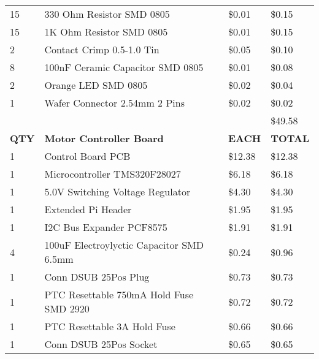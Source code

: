 \begin{table}[H]
{\begin{tabular}{llll}
15           & 330 Ohm Resistor SMD 0805                            & \$0.01        & \$0.15         \\
15           & 1K Ohm Resistor SMD 0805                             & \$0.01        & \$0.15         \\
2            & Contact Crimp 0.5-1.0 Tin                            & \$0.05        & \$0.10         \\
8            & 100nF Ceramic Capacitor SMD 0805                     & \$0.01        & \$0.08         \\
2            & Orange LED SMD 0805                                  & \$0.02        & \$0.04         \\
1            & Wafer Connector 2.54mm 2 Pins                        & \$0.02        & \$0.02         \\
             &                                                      &               & \$49.58        \\  \hline \hline
\textbf{QTY} & \textbf{Motor Controller Board}                      & \textbf{EACH} & \textbf{TOTAL} \\
1            & Control Board PCB                                    & \$12.38       & \$12.38        \\
1            & Microcontroller TMS320F28027                         & \$6.18        & \$6.18         \\
1            & 5.0V Switching Voltage Regulator                     & \$4.30        & \$4.30         \\
1            & Extended Pi Header                                   & \$1.95        & \$1.95         \\
1            & I2C Bus Expander PCF8575                             & \$1.91        & \$1.91         \\
4            & 100uF Electroylyctic Capacitor SMD 6.5mm             & \$0.24        & \$0.96         \\
1            & Conn DSUB 25Pos Plug                                 & \$0.73        & \$0.73         \\
1            & PTC Resettable 750mA Hold Fuse SMD 2920              & \$0.72        & \$0.72         \\
1            & PTC Resettable 3A Hold Fuse                          & \$0.66        & \$0.66         \\
1            & Conn DSUB 25Pos Socket                               & \$0.65        & \$0.65         \\

\end{tabular}}
\end{table}
